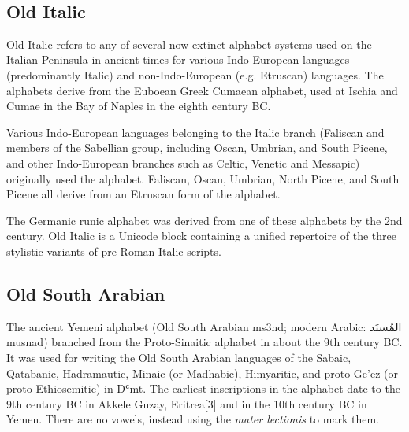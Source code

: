 ^^A
^^A
^^A
^^A
^^A
^^A
^^A

\subsection{Old Italic}

\newfontfamily{}

Old Italic refers to any of several now extinct alphabet systems used on the Italian Peninsula in ancient times for various Indo-European languages (predominantly Italic) and non-Indo-European (e.g. Etruscan) languages. The alphabets derive from the Euboean Greek Cumaean alphabet, used at Ischia and Cumae in the Bay of Naples in the eighth century BC.

Various Indo-European languages belonging to the Italic branch (Faliscan and members of the Sabellian group, including Oscan, Umbrian, and South Picene, and other Indo-European branches such as Celtic, Venetic and Messapic) originally used the alphabet. Faliscan, Oscan, Umbrian, North Picene, and South Picene all derive from an Etruscan form of the alphabet.

The Germanic runic alphabet was derived from one of these alphabets by the 2nd century.
Old Italic is a Unicode block containing a unified repertoire of the three stylistic variants of pre-Roman Italic scripts.

\begin{scriptexample}[]{}
\end{scriptexample}

\subsection{Old South Arabian}

\newfontfamily{}

The ancient Yemeni alphabet (Old South Arabian ms3nd; modern Arabic: {\arabicfont المُسنَد‎}  musnad) branched from the Proto-Sinaitic alphabet in about the 9th century BC. It was used for writing the Old South Arabian languages of the Sabaic, Qatabanic, Hadramautic, Minaic (or Madhabic), Himyaritic, and proto-Ge'ez (or proto-Ethiosemitic) in Dʿmt. The earliest inscriptions in the alphabet date to the 9th century BC in Akkele Guzay, Eritrea[3] and in the 10th century BC in Yemen. There are no vowels, instead using the \emph{mater lectionis} to mark them.

